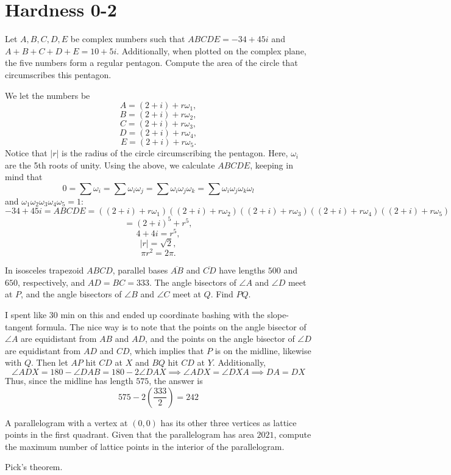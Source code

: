 \documentclass[11pt]{scrartcl}
\begin{document}
\section{Hardness 0-2}
\begin{example}
  Let $A,B,C,D,E$ be complex numbers such that $ABCDE=-34+45i$ and $A+B+C+D+E=10+5i$. Additionally, when plotted on the complex plane, the five numbers form a regular pentagon. Compute the area of the circle that circumscribes this pentagon.
\end{example}
\begin{soln}
  We let the numbers be
$$A=(2+i)+r\omega_1,$$
$$B=(2+i)+r\omega_2,$$
$$C=(2+i)+r\omega_3,$$
$$D=(2+i)+r\omega_4,$$
$$E=(2+i)+r\omega_5.$$
Notice that $|r|$ is the radius of the circle circumscribing the pentagon. Here, $\omega_i$ are the 5th roots of unity. Using the above, we calculate $ABCDE$, keeping in mind that
$$0=\sum \omega_i = \sum \omega_i\omega_j = \sum \omega_i \omega_j \omega_k = \sum \omega_i \omega_j \omega_k \omega_l$$
and $\omega_1\omega_2\omega_3\omega_4\omega_5=1$:
$$-34+45i=ABCDE = ((2+i)+r\omega_1)((2+i)+r\omega_2)((2+i)+r\omega_3)((2+i)+r\omega_4)((2+i)+r\omega_5)$$
$$=(2+i)^5+r^5,$$
$$4+4i=r^5,$$
$$|r|=\sqrt{2},$$
$$\pi r^2 = \boxed{2\pi.}$$

\end{soln}
\begin{example}
   [2022 AIME I \#3]
   In isosceles trapezoid $ABCD$, parallel bases $\overline{AB}$ and $\overline{CD}$ have lengths $500$ and $650$, respectively, and $AD=BC=333$. The angle bisectors of $\angle{A}$ and $\angle{D}$ meet at $P$, and the angle bisectors of $\angle{B}$ and $\angle{C}$ meet at $Q$. Find $PQ$.
\end{example}
\begin{soln}
  I spent like 30 min on this and ended up coordinate bashing with the slope-tangent formula. The nice way is to note that the points on the angle bisector of $\angle A$ are equidistant from $AB$ and $AD$, and the points on the angle bisector of $\angle D$ are equidistant from $AD$ and $CD$, which implies that $P$ is on the midline, likewise with $Q$. Then let $AP$ hit $CD$ at $X$ and $BQ$ hit $CD$ at $Y$. Additionally,
$$\angle ADX=180-\angle DAB=180-2\angle DAX\implies \angle ADX=\angle DXA\implies DA=DX$$Thus, since the midline has length $575$, the answer is
$$575-2\left(\frac{333}{2}\right)=242$$
\end{soln}
\begin{example}
  A parallelogram with a vertex at $(0, 0)$ has its other three vertices as lattice points in the first quadrant. Given that the parallelogram has area $2021$, compute the maximum number of lattice points in the interior of the parallelogram.
\end{example}
\begin{soln}
  Pick's theorem.
\end{soln}
\newpage
\end{document}
